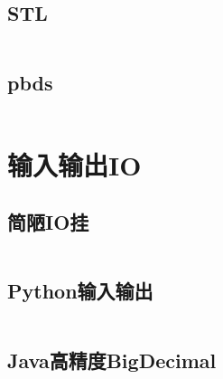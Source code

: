 \documentclass[twoside,sub3section,UTF8]{ctexart}						%
\begin{document}
	\subsection{STL}
	\inputminted{c++}{"Other/STL.cpp"}
	\subsection{pbds}
	\inputminted{c++}{"Other/pbds.cpp"}

\newpage
\section{输入输出IO}
	\subsection{简陋IO挂}
	\inputminted{c++}{"IO/IO.cpp"}
	\subsection{Python输入输出}
	\inputminted{python}{"IO/IO.py"}
	\subsection{Java高精度BigDecimal}
	\inputminted{java}{"IO/IO.java"}
\end{document}
